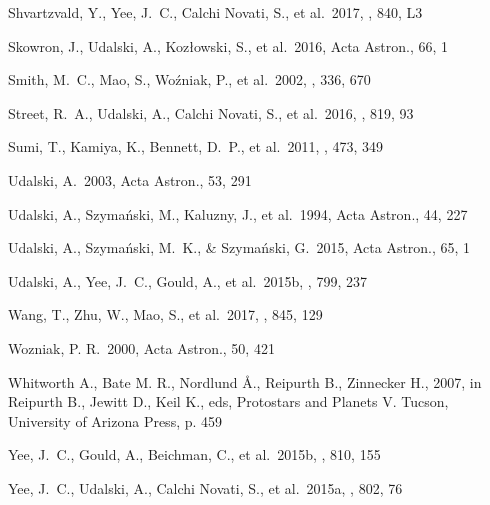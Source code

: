 \documentclass[10pt]{emulateapj}
\begin{document}
\begin{thebibliography}{999}
Shvartzvald, Y., Yee, J.~C., Calchi Novati, S., et al.\ 2017, \apjl, 840, L3 

Skowron, J., Udalski, A., Koz{\l}owski, S., et al.\ 2016, Acta Astron., 66, 1 

Smith, M.~C., Mao, S., Wo{\'z}niak, P., et al.\ 2002, \mnras, 336, 670 

Street, R.~A., Udalski, A., Calchi Novati, S., et al.\ 2016, \apj, 819, 93 

Sumi, T., Kamiya, K., Bennett, D.~P., et al.\ 2011, \nat, 473, 349 

Udalski, A.\ 2003, Acta Astron., 53, 291

Udalski, A., Szyma\'nski, M., Kaluzny, J., et al.\ 1994, Acta Astron., 44, 227

Udalski, A., Szyma{\'n}ski, M.~K., \& Szyma{\'n}ski, G.\ 2015, Acta Astron., 65, 1 

Udalski, A., Yee, J.~C., Gould, A., et al.\ 2015b, \apj, 799, 237 

Wang, T., Zhu, W., Mao, S., et al.\ 2017, \apj, 845, 129 

Wozniak, P. R.\ 2000, Acta Astron., 50, 421

Whitworth A., Bate M. R., Nordlund \r{A}., Reipurth B., Zinnecker H., 2007,
in Reipurth B., Jewitt D., Keil K., eds, Protostars and Planets V. Tucson,
University of Arizona Press, p. 459

Yee, J.~C., Gould, A., Beichman, C., et al.\ 2015b, \apj, 810, 155

Yee, J.~C., Udalski, A., Calchi Novati, S., et al.\ 2015a, \apj, 802, 76 


\end{thebibliography}
\end{document}

